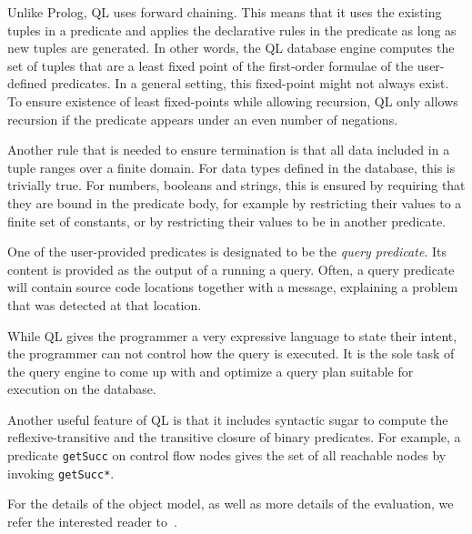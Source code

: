 Unlike Prolog, QL uses forward chaining.
This means that it uses the existing tuples in a predicate and applies the declarative
rules in the predicate as long as new tuples are generated.
In other words, the QL database engine computes the set of tuples that are a least fixed point 
of the first-order formulae of the user-defined predicates.
In a general setting, this fixed-point might not always exist.
To ensure existence of least fixed-points while allowing recursion,
QL only allows recursion if the predicate appears under an even number of negations.

Another rule that is needed to ensure termination is that all data included in a tuple 
ranges over a finite domain.
For data types defined in the database, this is trivially true.
For numbers, booleans and strings, this is ensured by requiring that they are bound 
in the predicate body, for example by restricting their values to a finite set of constants,
or by restricting their values to be in another predicate.

One of the user-provided predicates is designated to be the \emph{query predicate}.
Its content is provided as the output of a running a query.
Often, a query predicate will contain source code locations together with a message,
explaining a problem that was detected at that location.

While QL gives the programmer a very expressive language to state their intent,
the programmer can not control how the query is executed.
It is the sole task of the query engine to come up with and optimize a 
query plan suitable for execution on the database.

Another useful feature of QL is that it includes syntactic sugar to compute the reflexive-transitive
and the transitive closure of binary predicates.
For example, a predicate \texttt{getSucc} on control flow nodes gives the set of all reachable
nodes by invoking \texttt{getSucc*}.

For the details of the object model, as well as more details of the evaluation, we refer
the interested reader to~\cite{qlpaper}.
